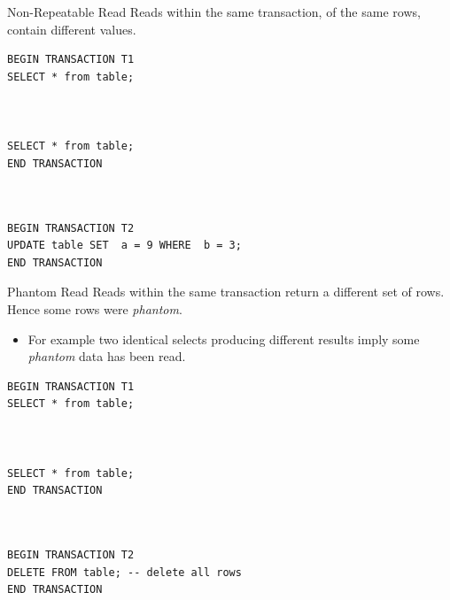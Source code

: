 \begin{definitionbox}{Non-Repeatable Read}
    Reads within the same transaction, of the same rows, contain different values.
    \tcblower
    \begin{minipage}[t]{.49\textwidth}
        \begin{verbatim}
BEGIN TRANSACTION T1
SELECT * from table;



SELECT * from table;
END TRANSACTION
       \end{verbatim}
   \end{minipage} \hfill \begin{minipage}[t]{.49\textwidth}
       \begin{verbatim}


BEGIN TRANSACTION T2
UPDATE table SET  a = 9 WHERE  b = 3;
END TRANSACTION

       \end{verbatim}
   \end{minipage}
\end{definitionbox}

\begin{definitionbox}{Phantom Read}
    Reads within the same transaction return a different set of rows. Hence some rows were \textit{phantom}.
    \begin{itemize}
        \item For example two identical selects producing different results imply some \textit{phantom} data has been read.
    \end{itemize}
    \tcblower
    \begin{minipage}[t]{.49\textwidth}
        \begin{verbatim}
BEGIN TRANSACTION T1
SELECT * from table;



SELECT * from table;
END TRANSACTION
       \end{verbatim}
   \end{minipage} \hfill \begin{minipage}[t]{.49\textwidth}
       \begin{verbatim}


BEGIN TRANSACTION T2
DELETE FROM table; -- delete all rows
END TRANSACTION

       \end{verbatim}
   \end{minipage}
\end{definitionbox}


